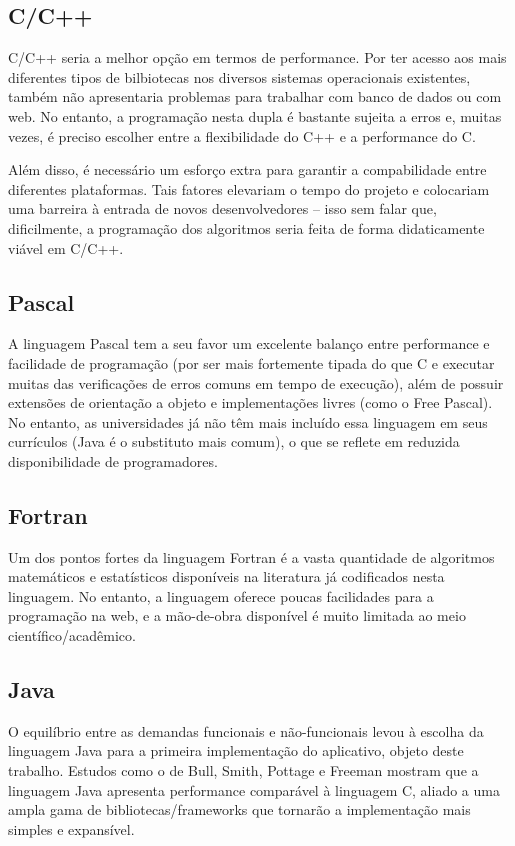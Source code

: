 \documentclass{abnt}
\begin{document}
\subsection{C/C++}
	C/C++ seria a melhor opção em termos de performance. Por ter acesso aos mais diferentes tipos de bilbiotecas nos diversos sistemas operacionais existentes, também não apresentaria problemas para trabalhar com banco de dados ou com web. No entanto, a programação nesta dupla é bastante sujeita a erros e, muitas vezes, é preciso escolher entre a flexibilidade do C++ e a performance do C.

	Além disso, é necessário um esforço extra para garantir a compabilidade entre diferentes plataformas. Tais fatores elevariam o tempo do  projeto e colocariam uma barreira à entrada de novos desenvolvedores – isso sem falar que, dificilmente, a programação dos algoritmos seria feita de forma didaticamente viável em C/C++.

\subsection{Pascal}
	A linguagem Pascal tem a seu favor um excelente balanço entre performance e facilidade de programação (por ser mais fortemente tipada do que C e executar muitas das verificações de erros comuns em tempo de execução), além de possuir extensões de orientação a objeto e implementações livres (como o Free Pascal). No entanto, as universidades já não têm mais incluído essa linguagem em seus currículos (Java é o substituto mais comum), o que se reflete em reduzida disponibilidade de programadores.

\subsection{Fortran}
	Um dos pontos fortes da linguagem Fortran é a vasta quantidade de algoritmos matemáticos e estatísticos disponíveis na literatura já codificados nesta linguagem. No entanto, a linguagem oferece poucas facilidades para a programação na web, e a mão-de-obra disponível é muito limitada ao meio científico/acadêmico.

	\subsection{Java}
	O equilíbrio entre as demandas funcionais e não-funcionais levou à escolha da linguagem Java para a primeira implementação do aplicativo, objeto deste trabalho. Estudos como o de Bull, Smith, Pottage e Freeman\cite{BullSmithPottageFreeman} mostram que a linguagem Java apresenta performance comparável à linguagem C, aliado a uma ampla gama de bibliotecas/frameworks que tornarão a implementação mais simples e expansível.
\end{document}
